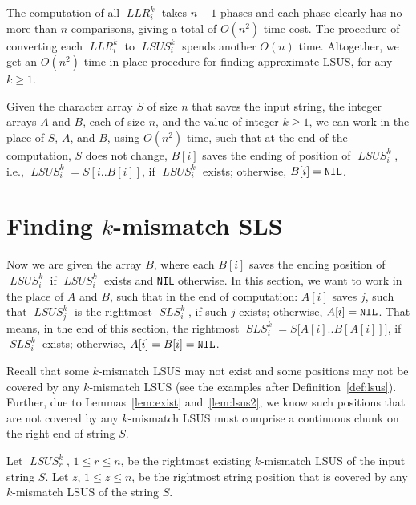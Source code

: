 \documentclass[11pt]{llncs}
\DeclareMathOperator{\lsus}{\mathit{LSUS}}
\DeclareMathOperator{\sls}{\mathit{SLS}}
\DeclareMathOperator{\llr}{\mathit{LLR}}
\begin{document}
\medskip 

The computation 
of all $\llr_i^k$ takes
 $n-1$ phases and each phase clearly has no more
than $n$ comparisons, giving a total of $O(n^2)$ time cost. 
The procedure of converting each $\llr_i^k$ to $\lsus_i^k$ spends
another $O(n)$ time. Altogether, we get an $O(n^2)$-time in-place
procedure for finding approximate LSUS, for any $k\geq 1$.

\begin{lemma}
\label{lem:lsus-k}
  Given the character array $S$ of  size $n$ that saves the input string, 
  the integer arrays $A$ and $B$, each of size $n$, and the value
  of integer $k\geq 1$, we can work
  in the place of $S$, $A$, and $B$, using $O(n^2)$ time, such that at
  the end of the computation, $S$ does not change, $B[i]$ saves the
  ending of position of $\lsus_i^k$,
i.e., $\lsus_i^k = S[i.. B[i]]$,
 if $\lsus_i^k$ exists; otherwise,
  $B[i]={\tt NIL}$.
\end{lemma}




\section{Finding $k$-mismatch SLS}
\label{sec:sls}
Now we are given the array $B$, where each $B[i]$ saves the ending
position of $\lsus_i^k$ if $\lsus_i^k$ exists and {\tt NIL}
otherwise. In this section, we want to work in the place of $A$ and
$B$, such that in the end of computation: $A[i]$ saves $j$, such that
$\lsus_j^k$ is the rightmost $\sls_i^k$, if such $j$ exists;
otherwise, $A[i]={\tt NIL}$.
That means, in the end of this section, the rightmost $\sls_i^k =
S\bigl[A[i].. B[A[i]]\bigr]$, if $\sls_i^k$ exists; otherwise,
$A[i] = B[i] = {\tt NIL}$.

Recall that some $k$-mismatch LSUS may not exist and some positions
may not be covered by any $k$-mismatch LSUS (see the examples after
Definition~\ref{def:lsus}). Further, due to Lemmas~\ref{lem:exist}
and~\ref{lem:lsus2}, we know such positions that are not covered by any
$k$-mismatch LSUS must comprise a continuous chunk on the right end of
string $S$.

\begin{definition}
\label{def:rz}
Let $\lsus_r^k$, $1\leq r\leq n$, be the rightmost existing
$k$-mismatch LSUS of the input string $S$.
Let $z$, $1\leq z\leq n$, be the rightmost string position that is
covered by any $k$-mismatch LSUS  of the string $S$.
\end{definition}
\end{document}
